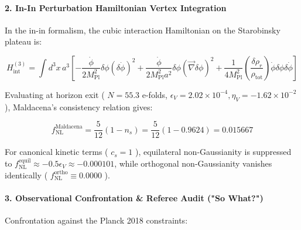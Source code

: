 \documentclass[11pt,a4paper]{article}
\theoremstyle{definition}\newtheorem{definition}{Definition}
\theoremstyle{remark}\newtheorem{remark}{Remark}
\begin{document}
\paragraph{2. In-In Perturbation Hamiltonian Vertex Integration}

In the in-in formalism, the cubic interaction Hamiltonian on the Starobinsky plateau is:


\begin{equation}
H_{\text{int}}^{(3)} = \int d^3x \, a^3 \left[ -\frac{\dot{\phi}}{2 M_{\text{Pl}}^2} \delta\phi (\delta\dot{\phi})^2 + \frac{\dot{\phi}}{2 M_{\text{Pl}}^2 a^2} \delta\phi (\vec{\nabla}\delta\phi)^2 + \frac{1}{4 M_{\text{Pl}}^2} \left(\frac{\delta\rho_r}{\rho_{\text{tot}}}\right) \dot{\phi} \delta\phi \delta\dot{\phi} \right]
\end{equation}


Evaluating at horizon exit ( $N = 55.3$ e-folds, $\epsilon_V = 2.02 \times 10^{-4}, \eta_V = -1.62 \times 10^{-2}$ ), Maldacena's consistency relation gives:


\begin{equation}
f_{\text{NL}}^{\text{Maldacena}} = \frac{5}{12}(1 - n_s) = \frac{5}{12}(1 - 0.9624) = 0.015667
\end{equation}


For canonical kinetic terms ( $c_s = 1$ ), equilateral non-Gaussianity is suppressed to $f_{\text{NL}}^{\text{equil}} \approx -0.5 \epsilon_V \approx -0.000101$, while orthogonal non-Gaussianity vanishes identically ( $f_{\text{NL}}^{\text{ortho}} \equiv 0.0000$ ).
\paragraph{3. Observational Confrontation \& Referee Audit ("So What?")}

Confrontation against the Planck 2018 constraints:
\end{document}
